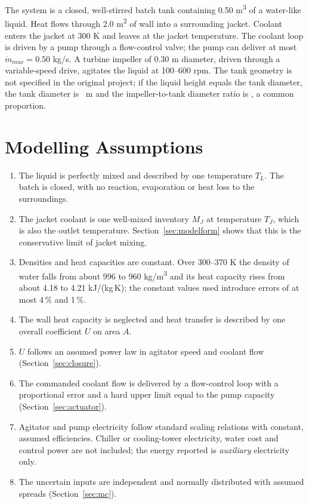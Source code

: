\documentclass[11pt,letterpaper]{article}
\newcommand{\mdot}{\dot m}
\begin{document}
The system is a closed, well-stirred batch tank containing 0.50 m\textsuperscript{3} of a water-like liquid. Heat flows through 2.0 m\textsuperscript{2} of wall into a surrounding jacket. Coolant enters the jacket at 300 K and leaves at the jacket temperature. The coolant loop is driven by a pump through a flow-control valve; the pump can deliver at most \(\mdot_{max}=0.50\) kg/s. A turbine impeller of 0.30 m diameter, driven through a variable-speed drive, agitates the liquid at 100--600 rpm. The tank geometry is not specified in the original project; if the liquid height equals the tank diameter, the tank diameter is \vTankD\ m and the impeller-to-tank diameter ratio is \vDT, a common proportion.

\section{Modelling Assumptions}

\begin{enumerate}[leftmargin=*]
\item The liquid is perfectly mixed and described by one temperature \(T_L\). The batch is closed, with no reaction, evaporation or heat loss to the surroundings.
\item The jacket coolant is one well-mixed inventory \(M_J\) at temperature \(T_J\), which is also the outlet temperature. Section~\ref{sec:modelform} shows that this is the conservative limit of jacket mixing.
\item Densities and heat capacities are constant. Over 300--370 K the density of water falls from about 996 to 960 kg/m\textsuperscript{3} and its heat capacity rises from about 4.18 to 4.21 kJ/(kg\,K); the constant values used introduce errors of at most 4\,\% and 1\,\%.
\item The wall heat capacity is neglected and heat transfer is described by one overall coefficient \(U\) on area \(A\).
\item \(U\) follows an assumed power law in agitator speed and coolant flow (Section~\ref{sec:closure}).
\item The commanded coolant flow is delivered by a flow-control loop with a proportional error and a hard upper limit equal to the pump capacity (Section~\ref{sec:actuator}).
\item Agitator and pump electricity follow standard scaling relations with constant, assumed efficiencies. Chiller or cooling-tower electricity, water cost and control power are not included; the energy reported is \emph{auxiliary} electricity only.
\item The uncertain inputs are independent and normally distributed with assumed spreads (Section~\ref{sec:mc}).
\end{enumerate}
\end{document}
